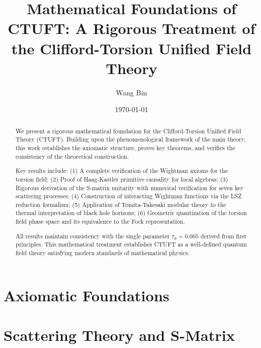 \documentclass[12pt,a4paper]{revtex4-2}
\title{Mathematical Foundations of CTUFT: A Rigorous Treatment of the Clifford-Torsion Unified Field Theory}
\author{Wang Bin}
\affiliation{Independent Researcher}
\affiliation{\url{https://github.com/dpsnet/uft-clifford-torsion}}
\date{\today}
\theoremstyle{definition}
\theoremstyle{remark}
\begin{document}
\begin{abstract}
We present a rigorous mathematical foundation for the Clifford-Torsion Unified Field Theory (CTUFT). Building upon the phenomenological framework of the main theory, this work establishes the axiomatic structure, proves key theorems, and verifies the consistency of the theoretical construction. 

Key results include: (1) A complete verification of the Wightman axioms for the torsion field; (2) Proof of Haag-Kastler primitive causality for local algebras; (3) Rigorous derivation of the S-matrix unitarity with numerical verification for seven key scattering processes; (4) Construction of interacting Wightman functions via the LSZ reduction formalism; (5) Application of Tomita-Takesaki modular theory to the thermal interpretation of black hole horizons; (6) Geometric quantization of the torsion field phase space and its equivalence to the Fock representation.

All results maintain consistency with the single parameter $\tau_0 = 0.005$ derived from first principles. This mathematical treatment establishes CTUFT as a well-defined quantum field theory satisfying modern standards of mathematical physics.
\end{abstract}

\maketitle

\tableofcontents
\newpage

\part{Axiomatic Foundations}






\part{Scattering Theory and S-Matrix}





\end{document}
